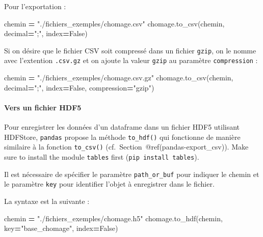 \documentclass[
  12pt,
]{book}
\newenvironment{Shaded}{\begin{snugshade}}{\end{snugshade}}
\newcommand{\NormalTok}[1]{#1}
\newcommand{\OperatorTok}[1]{\textcolor[rgb]{0.81,0.36,0.00}{\textbf{#1}}}
\newcommand{\StringTok}[1]{\textcolor[rgb]{0.31,0.60,0.02}{#1}}
\newcommand{\VariableTok}[1]{\textcolor[rgb]{0.00,0.00,0.00}{#1}}
\numberwithin{equation}{section}
\numberwithin{countremarque}{section}
\begin{document}
Pour l'exportation :

\begin{Shaded}
\begin{Highlighting}[]
\NormalTok{chemin }\OperatorTok{=} \StringTok{"./fichiers\_exemples/chomage.csv"}
\NormalTok{chomage.to\_csv(chemin, decimal}\OperatorTok{=}\StringTok{";"}\NormalTok{, index}\OperatorTok{=}\VariableTok{False}\NormalTok{)}
\end{Highlighting}
\end{Shaded}

Si on désire que le fichier CSV soit compressé dans un fichier \texttt{gzip}, on le nomme avec l'extention \texttt{.csv.gz} et on ajoute la valeur \texttt{gzip} au paramètre \texttt{compression} :

\begin{Shaded}
\begin{Highlighting}[]
\NormalTok{chemin }\OperatorTok{=} \StringTok{"./fichiers\_exemples/chomage.csv.gz"}
\NormalTok{chomage.to\_csv(chemin, decimal}\OperatorTok{=}\StringTok{";"}\NormalTok{, index}\OperatorTok{=}\VariableTok{False}\NormalTok{, compression}\OperatorTok{=}\StringTok{"gzip"}\NormalTok{)}
\end{Highlighting}
\end{Shaded}

\paragraph{Vers un fichier HDF5}\label{vers-un-fichier-hdf5}

Pour enregistrer les données d'un dataframe dans un fichier HDF5 utilisant HDFStore, \texttt{pandas} propose la méthode \texttt{to\_hdf()} qui fonctionne de manière similaire à la fonction \texttt{to\_csv()} (cf.~Section~@ref(pandas-export\_csv)). Make sure to install the module \texttt{tables} first (\texttt{pip\ install\ tables}).

Il est nécessaire de spécifier le paramètre \texttt{path\_or\_buf} pour indiquer le chemin et le paramètre \texttt{key} pour identifier l'objet à enregistrer dans le fichier.

La syntaxe est la suivante :

\begin{Shaded}
\begin{Highlighting}[]
\NormalTok{chemin }\OperatorTok{=} \StringTok{"./fichiers\_exemples/chomage.h5"}
\NormalTok{chomage.to\_hdf(chemin, key}\OperatorTok{=}\StringTok{"base\_chomage"}\NormalTok{, index}\OperatorTok{=}\VariableTok{False}\NormalTok{)}
\end{Highlighting}
\end{Shaded}
\end{document}
